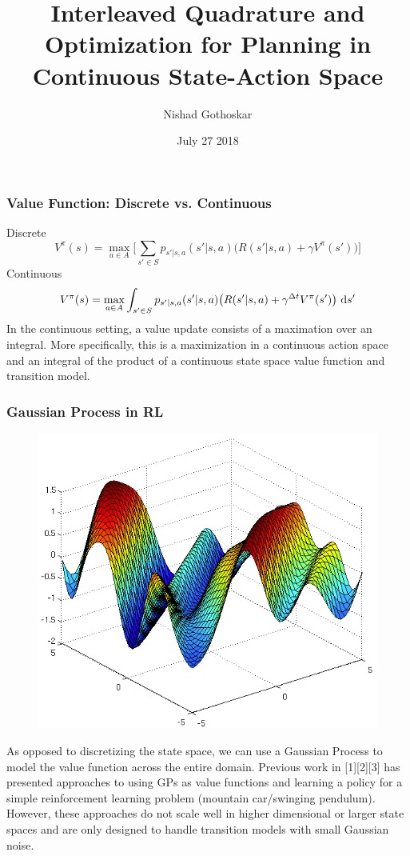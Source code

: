 \documentclass[8pt]{beamer}
\title{Interleaved Quadrature and Optimization for Planning in Continuous State-Action Space}
\author{Nishad Gothoskar}
\institute{LIS}
\date{July 27 2018}
\begin{document}
 
\frame{\titlepage}
 
\begin{frame}
\frametitle{Value Function: Discrete vs. Continuous}
Discrete
\begin{equation*}    %
        V^{\pi}(s) = \max_{a \in A} \Big[\sum_{s' \in S} p_{s'|s,a}(s'|s,a)\big(R(s'|s,a) + \gamma V^{\pi}(s')\big) \Big]
\end{equation*}
Continuous
\begin{equation*}    %
        V^{\pi}(s) = \max_{a \in A} \int_{s' \in S} p_{s'|s,a}(s'|s,a)\big(R(s'|s,a) + \gamma^{\Delta t}V^{\pi}(s')\big) \ \textup{d}s'
\end{equation*}
\newline
In the continuous setting, a value update consists of a maximation over an integral.  More specifically, this is a maximization in a continuous action space and an integral of the product of a continuous state space value function and transition model.
\end{frame}

\begin{frame}
\frametitle{Gaussian Process in RL}
\begin{figure}
\includegraphics[scale=0.15]{gp}
\end{figure}
As opposed to discretizing the state space, we can use a Gaussian Process to model the value function across the entire domain. Previous work in [1][2][3] has presented approaches to using GPs as value functions and learning a policy for a simple reinforcement learning problem (mountain car/swinging pendulum).
\newline \newline
However, these approaches do not scale well in higher dimensional or larger state spaces and are only designed to handle transition models with small Gaussian noise.
\end{frame}
\end{document}
